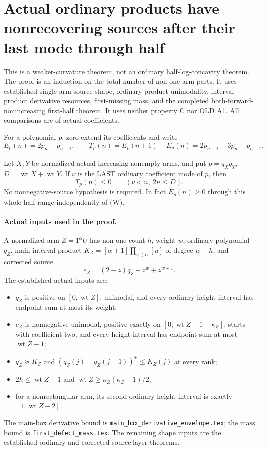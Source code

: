 \section{Actual ordinary products have nonrecovering sources after their last mode through half}
This is a weaker-curvature theorem, not an ordinary half-log-concavity
theorem. The proof is an induction on the total number of non-one arm
parts. It uses established single-arm source shape, ordinary-product
unimodality, interval-product derivative resources, first-missing mass,
and the completed both-forward-nonincreasing first-half theorem. It uses
neither property C nor OLD A1. All comparisons are of actual coefficients.

For a polynomial $p$, zero-extend its coefficients and write
\[
 E_p(n)=2p_n-p_{n-1},\qquad
 T_p(n)=E_p(n+1)-E_p(n)=2p_{n+1}-3p_n+p_{n-1}.
\]
\begin{theorem}\label{thm:actual-half-tail}
Let $X,Y$ be normalized actual increasing nonempty arms, and put
$p=q_Xq_Y$, $D=\operatorname{wt}X+\operatorname{wt}Y$.
If $\nu$ is the LAST ordinary coefficient mode of $p$, then
\[
                        T_p(n)\le0\qquad(\nu<n,\ 2n\le D). \tag{W}
\]
No nonnegative-source hypothesis is required. In fact $E_p(n)\ge0$
through this whole half range independently of (W).
\end{theorem}

\paragraph{Actual inputs used in the proof.}
A normalized arm $Z=1^\alpha U$ has non-one count $h$, weight $w$,
ordinary polynomial $q_Z$, main interval product
$K_Z=[\alpha+1]\prod_{u\in U}[u]$ of degree $w-h$, and corrected source
\[
 e_Z=(2-z)q_Z-z^w+z^{w+1}.
\]
The established actual inputs are:
\begin{itemize}
\item $q_Z$ is positive on $[0,\operatorname{wt}Z]$, unimodal,
and every ordinary height interval has endpoint sum at most its weight;
\item $e_Z$ is nonnegative unimodal, positive exactly on
$[0,\operatorname{wt}Z+1-\kappa_Z]$, starts with coefficient two,
and every height interval has endpoint sum at most $\operatorname{wt}Z-1$;
\item $q_Z\succeq K_Z$ and
$(q_Z(j)-q_Z(j-1))^+\le K_Z(j)$ at every rank;
\item $2h\le\operatorname{wt}Z-1$ and
$\operatorname{wt}Z\ge\kappa_Z(\kappa_Z-1)/2$;
\item for a nonrectangular arm, its second ordinary height interval is
exactly $[1,\operatorname{wt}Z-2]$.
\end{itemize}
The main-box derivative bound is
\texttt{main\_box\_derivative\_envelope.tex}; the mass bound is
\texttt{first\_defect\_mass.tex}. The remaining shape inputs are the
established ordinary and corrected-source layer theorems.

